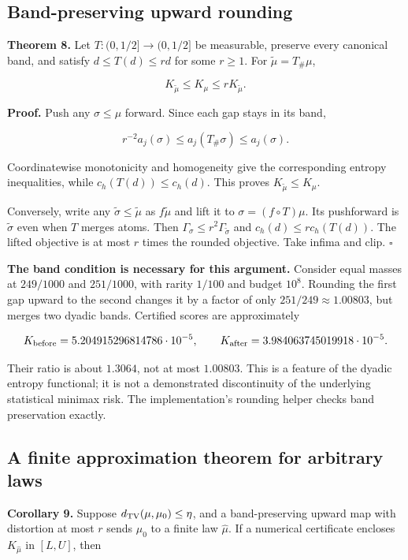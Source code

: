 \documentclass[
  11pt,
  a4paper,
]{article}
\begin{document}
\subsection{Band-preserving upward
rounding}\label{band-preserving-upward-rounding}

\textbf{Theorem 8.} Let \(T:(0,1/2]\to(0,1/2]\) be measurable, preserve
every canonical band, and satisfy \(d\le T(d)\le rd\) for some
\(r\ge1\). For \(\widetilde\mu=T_\#\mu\),

\[
\boxed{K_{\widetilde\mu}\le K_\mu\le rK_{\widetilde\mu}.}
\]

\textbf{Proof.} Push any \(\sigma\le\mu\) forward. Since each gap stays
in its band,

\[
r^{-2}a_j(\sigma)\le a_j(T_\#\sigma)\le a_j(\sigma).
\]

Coordinatewise monotonicity and homogeneity give the corresponding
entropy inequalities, while \(c_h(T(d))\le c_h(d)\). This proves
\(K_{\widetilde\mu}\le K_\mu\).

Conversely, write any \(\widetilde\sigma\le\widetilde\mu\) as
\(f\widetilde\mu\) and lift it to \(\sigma=(f\circ T)\mu\). Its
pushforward is \(\widetilde\sigma\) even when \(T\) merges atoms. Then
\(\Gamma_\sigma\le r^2\Gamma_{\widetilde\sigma}\) and
\(c_h(d)\le r c_h(T(d))\). The lifted objective is at most \(r\) times
the rounded objective. Take infima and clip. \(\square\)

\textbf{The band condition is necessary for this argument.} Consider
equal masses at \(249/1000\) and \(251/1000\), with rarity \(1/100\) and
budget \(10^8\). Rounding the first gap upward to the second changes it
by a factor of only \(251/249\approx1.00803\), but merges two dyadic
bands. Certified scores are approximately

\[
K_{\rm before}=5.204915296814786\cdot10^{-5},\qquad
K_{\rm after}=3.984063745019918\cdot10^{-5}.
\]

Their ratio is about \(1.3064\), not at most \(1.00803\). This is a
feature of the dyadic entropy functional; it is not a demonstrated
discontinuity of the underlying statistical minimax risk. The
implementation's rounding helper checks band preservation exactly.

\subsection{A finite approximation theorem for arbitrary
laws}\label{a-finite-approximation-theorem-for-arbitrary-laws}

\textbf{Corollary 9.} Suppose \(d_{\rm TV}(\mu,\mu_0)\le\eta\), and a
band-preserving upward map with distortion at most \(r\) sends \(\mu_0\)
to a finite law \(\widehat\mu\). If a numerical certificate encloses
\(K_{\widehat\mu}\) in \([L,U]\), then
\end{document}
